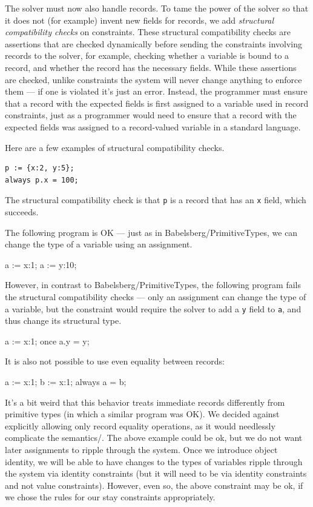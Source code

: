 \documentclass{article}
\newcounter{examples}
\begin{document}
The solver must now also handle records.  To tame the power of the
solver so that it does not (for example) invent new fields for
records, we add \emph{structural compatibility checks} on constraints.
These structural compatibility checks are assertions that are checked
dynamically before sending the constraints involving records to the
solver, for example, checking whether a variable is bound to a record,
and whether the record has the necessary fields.  While these
assertions are checked, unlike constraints the system will
never change anything to enforce them --- if one is violated it's just
an error.  Instead, the programmer must ensure that a record with the
expected fields is first assigned to a variable used in record
constraints, just as a programmer would need to ensure that a record
with the expected fields was assigned to a record-valued variable in a
standard language.

Here are a few examples of structural compatibility checks.

\begin{verbatim}
p := {x:2, y:5};
always p.x = 100;
\end{verbatim}
The structural compatibility check is that \verb|p| is a record that
has an \verb|x| field, which succeeds.

The following program is OK --- just as in Babelsberg/PrimitiveTypes,
we can change the type of a variable using an assignment.

\begin{example}
a := {x:1};
a := {y:10};
\end{example}

However, in contrast to Babelsberg/PrimitiveTypes, the following
program fails the structural compatibility checks --- only an
assignment can change the type of a variable, but the constraint would
require the solver to add a \verb!y! field to \verb!a!, and thus change
its structural type.

\begin{example}
a := {x:1};
once a.y = y;
\end{example}

It is also not possible to use even equality between records:
\begin{example}
a := {x:1};
b := {x:1};
always a = b;
\end{example}
It's a bit weird that this behavior treats immediate records
differently from primitive types (in which a similar program was OK).
We decided against explicitly allowing only record equality
operations, as it would needlessly complicate the semantics/.  The
above example could be ok, but we do not want later assignments to
ripple through the system. Once we introduce object identity, we will
be able to have changes to the types of variables ripple through the
system via identity constraints (but it will need to be via identity
constraints and not value constraints). However, even so, the above
constraint may be ok, if we chose the rules for our stay constraints
appropriately.
\end{document}
